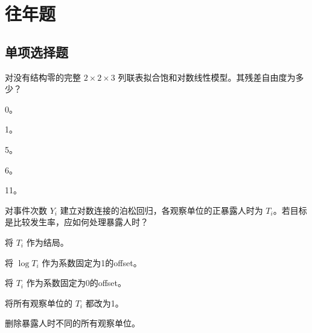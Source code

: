 \par\addvspace{8pt}\noindent\begin{minipage}{\linewidth}

\section{往年题}

\subsection{单项选择题}


对没有结构零的完整 \(2\times2\times3\) 列联表拟合饱和对数线性模型。其残差自由度为多少？


\begin{choices}

\item 0。

\item 1。

\item 5。

\item 6。

\item 11。

\end{choices}

\end{minipage}\par\vspace{5pt}

\par\addvspace{8pt}\noindent\begin{minipage}{\linewidth}


对事件次数 \(Y_i\) 建立对数连接的泊松回归，各观察单位的正暴露人时为 \(T_i\)。若目标是比较发生率，应如何处理暴露人时？


\begin{choices}

\item 将 \(T_i\) 作为结局。

\item 将 \(\log T_i\) 作为系数固定为1的offset。

\item 将 \(T_i\) 作为系数固定为0的offset。

\item 将所有观察单位的 \(T_i\) 都改为1。

\item 删除暴露人时不同的所有观察单位。

\end{choices}

\end{minipage}\par\vspace{5pt}

